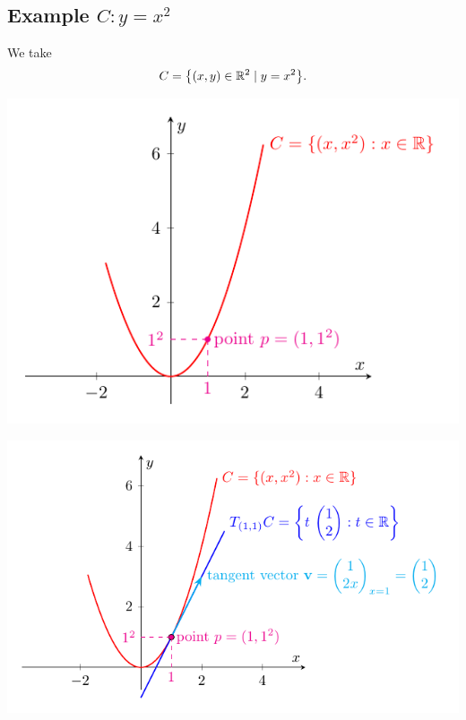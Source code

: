 \documentclass[11pt,openany]{article}
\begin{document}

\newpage
\subsection*{Example $C:y=x^2$}
We take \[
C=\bigl\{(x,y)\in\mathbb{R}^2\mid y=x^2\bigr\}.
\]
\begin{center}
\begin{minipage}{.49\textwidth}
	\includegraphics[scale=1]{tangent-space-example-1.pdf}
\end{minipage}
\begin{minipage}{.49\textwidth}
	\includegraphics[scale=1]{tangent-space-example-2.pdf}
\end{minipage}
\end{center}
\end{document}
